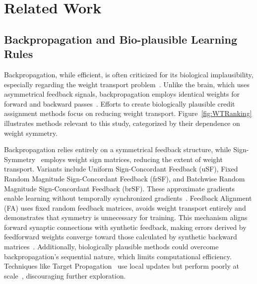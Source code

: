 \section{Related Work}
\subsection{Backpropagation and Bio-plausible Learning Rules}
Backpropagation, while efficient, is often criticized for its biological implausibility, especially regarding the weight transport problem~\cite{grossberg1987competitive,crick1989recent,schwartz1993computational}. Unlike the brain, which uses asymmetrical feedback signals, backpropagation employs identical weights for forward and backward passes~\cite{lillicrap2020backpropagation}. Efforts to create biologically plausible credit assignment methods focus on reducing weight transport. Figure~\ref{fig:WTRanking} illustrates methods relevant to this study, categorized by their dependence on weight symmetry.

Backpropagation relies entirely on a symmetrical feedback structure, while Sign-Symmetry~\cite{liao2016important} employs weight sign matrices, reducing the extent of weight transport. Variants include Uniform Sign-Concordant Feedback (uSF), Fixed Random Magnitude Sign-Concordant Feedback (frSF), and Batchwise Random Magnitude Sign-Concordant Feedback (brSF). These approximate gradients enable learning without temporally synchronized gradients~\cite{czarnecki2017understanding}. Feedback Alignment (FA) \cite{lillicrap2016random} uses fixed random feedback matrices, avoids weight transport entirely and demonstrates that symmetry is unnecessary for training. This mechanism aligns forward synaptic connections with synthetic feedback, making errors derived by feedforward weights converge toward those calculated by synthetic backward matrices~\cite{lillicrap2020backpropagation}. Additionally, biologically plausible methods could overcome backpropagation's sequential nature, which limits computational efficiency. Techniques like Target Propagation~\cite{le1986learning,hinton2007backpropagation,bengio2014auto,lee2015difference} use local updates but perform poorly at scale~\cite{bartunov2018assessing}, discouraging further exploration.

